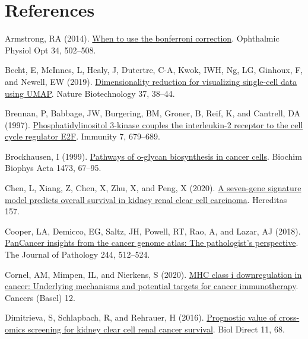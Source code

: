 \documentclass[
  parskip,
  oneside]{scrreprt}
\newlength{\cslhangindent}
\newlength{\cslentryspacingunit} %
\newenvironment{CSLReferences}[2] %
 {%
  \setlength{\parindent}{0pt}
  \ifodd #1
  \let\oldpar\par
  \def\par{\hangindent=\cslhangindent\oldpar}
  \fi
  \setlength{\parskip}{#2\cslentryspacingunit}
 }%
 {}
\begin{document}
\hypertarget{references}{%
\chapter{References}\label{references}}

\hypertarget{refs}{}
\begin{CSLReferences}{0}{0}
\leavevmode{}%
Armstrong, RA (2014). \href{https://doi.org/10.1111/opo.12131}{When to
use the bonferroni correction}. Ophthalmic Physiol Opt 34, 502--508.

\leavevmode{}%
Becht, E, McInnes, L, Healy, J, Dutertre, C-A, Kwok, IWH, Ng, LG,
Ginhoux, F, and Newell, EW (2019).
\href{https://doi.org/10.1038/nbt.4314}{Dimensionality reduction for
visualizing single-cell data using UMAP}. Nature Biotechnology 37,
38--44.

\leavevmode{}%
Brennan, P, Babbage, JW, Burgering, BM, Groner, B, Reif, K, and
Cantrell, DA (1997).
\href{https://doi.org/10.1016/s1074-7613(00)80388-x}{Phosphatidylinositol
3-kinase couples the interleukin-2 receptor to the cell cycle regulator
E2F}. Immunity 7, 679--689.

\leavevmode{}%
Brockhausen, I (1999).
\href{https://doi.org/10.1016/s0304-4165(99)00170-1}{Pathways of
o-glycan biosynthesis in cancer cells}. Biochim Biophys Acta 1473,
67--95.

\leavevmode{}%
Chen, L, Xiang, Z, Chen, X, Zhu, X, and Peng, X (2020).
\href{https://doi.org/10.1186/s41065-020-00152-y}{A seven-gene signature
model predicts overall survival in kidney renal clear cell carcinoma}.
Hereditas 157.

\leavevmode{}%
Cooper, LA, Demicco, EG, Saltz, JH, Powell, RT, Rao, A, and Lazar, AJ
(2018). \href{https://doi.org/10.1002/path.5028}{PanCancer insights from
the cancer genome atlas: The pathologist's perspective}. The Journal of
Pathology 244, 512--524.

\leavevmode{}%
Cornel, AM, Mimpen, IL, and Nierkens, S (2020).
\href{https://doi.org/10.3390/cancers12071760}{MHC class i
downregulation in cancer: Underlying mechanisms and potential targets
for cancer immunotherapy}. Cancers (Basel) 12.

\leavevmode{}%
Dimitrieva, S, Schlapbach, R, and Rehrauer, H (2016).
\href{https://doi.org/10.1186/s13062-016-0170-1}{Prognostic value of
cross-omics screening for kidney clear cell renal cancer survival}. Biol
Direct 11, 68.


\end{CSLReferences}
\end{document}
